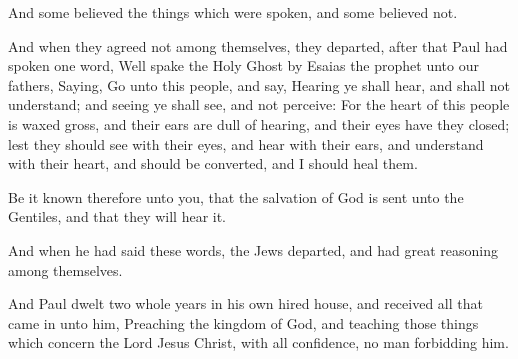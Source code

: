 \verse And some believed the things which were spoken, and some believed not.

\verse And when they agreed not among themselves, they departed, after that Paul had spoken one word, Well spake the Holy Ghost by Esaias the prophet unto our fathers, \verse Saying, Go unto this people, and say, Hearing ye shall hear, and shall not understand; and seeing ye shall see, and not perceive: \verse For the heart of this people is waxed gross, and their ears are dull of hearing, and their eyes have they closed; lest they should see with their eyes, and hear with their ears, and understand with their heart, and should be converted, and I should heal them.

\verse Be it known therefore unto you, that the salvation of God is sent unto the Gentiles, and that they will hear it.

\verse And when he had said these words, the Jews departed, and had great reasoning among themselves.

\verse And Paul dwelt two whole years in his own hired house, and received all that came in unto him, \verse Preaching the kingdom of God, and teaching those things which concern the Lord Jesus Christ, with all confidence, no man forbidding him.

